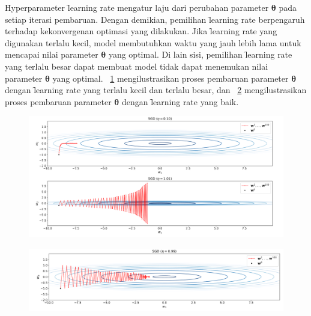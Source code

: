     \f{Hyperparameter} \f{learning rate} mengatur laju dari perubahan parameter $\bm{\theta}$ pada setiap iterasi pembaruan. Dengan demikian, pemilihan \f{learning rate} berpengaruh terhadap kekonvergenan optimasi yang dilakukan. Jika \f{learning rate} yang digunakan terlalu kecil, model membutuhkan waktu yang jauh lebih lama untuk mencapai nilai parameter $\bm{\theta}$ yang optimal. Di lain sisi, pemilihan \f{learning rate} yang terlalu besar dapat membuat model tidak dapat menemukan nilai parameter $\bm{\theta}$ yang optimal. \pic~\ref{fig:learning-rate-bad} mengilustrasikan proses pembaruan parameter $\bm{\theta}$ dengan \f{learning rate} yang terlalu kecil dan terlalu besar, dan \pic~\ref{fig:learning-rate-good} mengilustrasikan proses pembaruan parameter $\bm{\theta}$ dengan \f{learning rate} yang baik.
\begin{figure}
    \centering
    \includegraphics[width=1\textwidth]{assets/pics/learning-rate-bad.png}
    \label{fig:learning-rate-bad}
\end{figure}

\begin{figure}
    \centering
    \includegraphics[width=1\textwidth]{assets/pics/learning-rate-good.png}
    \label{fig:learning-rate-good}
\end{figure}

